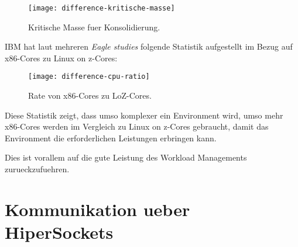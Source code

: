 \begin{figure}[h!]
\centering
\texttt{[image: difference-kritische-masse]}
\caption{Kritische Masse fuer Konsolidierung\cite{KonsolidierungKritischeMasse}.}
\label{fig:KonsolidierungKritischeMasse}
\end{figure}

IBM hat laut mehreren \textit{Eagle studies} folgende Statistik aufgestellt im Bezug auf x86-Cores zu Linux on z-Cores:

\begin{figure}[h!]
\centering
\texttt{[image: difference-cpu-ratio]}
\caption{Rate von x86-Cores zu LoZ-Cores\cite{CPURatio}.}
\label{fig:CPURatio}
\end{figure}

Diese Statistik zeigt, dass umso komplexer ein Environment wird, umso mehr x86-Cores werden im Vergleich zu Linux on z-Cores gebraucht,
damit das Environment die erforderlichen Leistungen erbringen kann.

Dies ist vorallem auf die gute Leistung des Workload Managements zurueckzufuehren.

\section{Kommunikation ueber HiperSockets}
